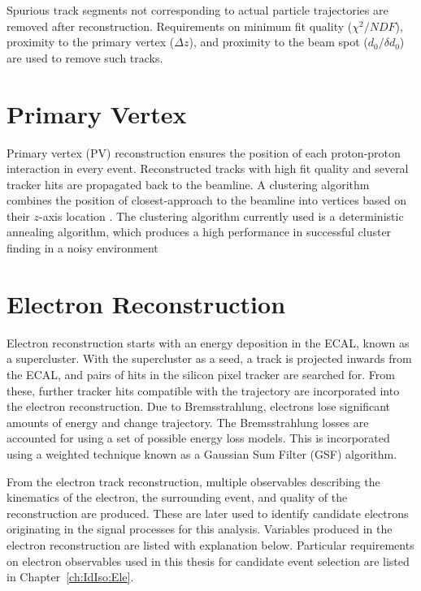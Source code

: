 Spurious track segments not corresponding to actual particle trajectories are removed after reconstruction. Requirements on minimum fit quality ($\chi^2/NDF$), proximity to the primary vertex ($\Delta z$), and proximity to the beam spot ($d_0/\delta d_0$) are used to remove such tracks. 

\section{Primary Vertex}
Primary vertex (PV) reconstruction ensures the position of each proton-proton interaction in every event. Reconstructed tracks with high fit quality and several tracker hits are propagated back to the beamline. A clustering algorithm combines the position of closest-approach to the beamline into vertices based on their $z$-axis location \cite{Chatrchyan:2014fea}. The clustering algorithm currently used is a deterministic annealing algorithm, which produces a high performance in successful cluster finding in a noisy environment \cite{Chabanat:2005zz}


\section{Electron Reconstruction}\label{ch:reco:ele}
Electron reconstruction starts with an energy deposition in the ECAL, known as a supercluster. With the supercluster as a seed, a track is projected inwards from the ECAL, and pairs of hits in the silicon pixel tracker are searched for. From these, further tracker hits compatible with the trajectory are incorporated into the electron reconstruction. Due to Bremsstrahlung, electrons lose significant amounts of energy and change trajectory. The Bremsstrahlung losses are accounted for using a set of possible energy loss models. This is incorporated using a weighted technique known as a Gaussian Sum Filter (GSF) algorithm. 

From the electron track reconstruction, multiple observables describing the kinematics of the electron, the surrounding event, and quality of the reconstruction are produced. These are later used to identify candidate electrons originating in the signal processes for this analysis. Variables produced in the electron reconstruction are listed with explanation below. Particular requirements on electron observables used in this thesis for candidate event selection are listed in Chapter~\ref{ch:IdIso:Ele}. 
